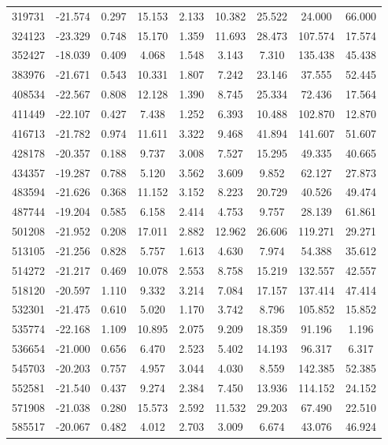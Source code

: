 \documentclass[fleqn,usenatbib]{mnras}
\begin{document}
\begin{table}
\begin{tabular}{S[table-format=6]S[table-format=+2.3]S[table-format=1.3]S[table-format=2.3]S[table-format=1.3]S[table-format=2.3]S[table-format=2.3]S[table-format=3.3]S[table-format=2.3]}
319731 & -21.574 & 0.297 & 15.153 & 2.133 & 10.382 & 25.522 & 24.000 & 66.000\\
324123 & -23.329 & 0.748 & 15.170 & 1.359 & 11.693 & 28.473 & 107.574 & 17.574\\
352427 & -18.039 & 0.409 & 4.068 & 1.548 & 3.143 & 7.310 & 135.438 & 45.438\\
383976 & -21.671 & 0.543 & 10.331 & 1.807 & 7.242 & 23.146 & 37.555 & 52.445\\
408534 & -22.567 & 0.808 & 12.128 & 1.390 & 8.745 & 25.334 & 72.436 & 17.564\\
411449 & -22.107 & 0.427 & 7.438 & 1.252 & 6.393 & 10.488 & 102.870 & 12.870\\
416713 & -21.782 & 0.974 & 11.611 & 3.322 & 9.468 & 41.894 & 141.607 & 51.607\\
428178 & -20.357 & 0.188 & 9.737 & 3.008 & 7.527 & 15.295 & 49.335 & 40.665\\
434357 & -19.287 & 0.788 & 5.120 & 3.562 & 3.609 & 9.852 & 62.127 & 27.873\\
483594 & -21.626 & 0.368 & 11.152 & 3.152 & 8.223 & 20.729 & 40.526 & 49.474\\
487744 & -19.204 & 0.585 & 6.158 & 2.414 & 4.753 & 9.757 & 28.139 & 61.861\\
501208 & -21.952 & 0.208 & 17.011 & 2.882 & 12.962 & 26.606 & 119.271 & 29.271\\
513105 & -21.256 & 0.828 & 5.757 & 1.613 & 4.630 & 7.974 & 54.388 & 35.612\\
514272 & -21.217 & 0.469 & 10.078 & 2.553 & 8.758 & 15.219 & 132.557 & 42.557\\
518120 & -20.597 & 1.110 & 9.332 & 3.214 & 7.084 & 17.157 & 137.414 & 47.414\\
532301 & -21.475 & 0.610 & 5.020 & 1.170 & 3.742 & 8.796 & 105.852 & 15.852\\
535774 & -22.168 & 1.109 & 10.895 & 2.075 & 9.209 & 18.359 & 91.196 & 1.196\\
536654 & -21.000 & 0.656 & 6.470 & 2.523 & 5.402 & 14.193 & 96.317 & 6.317\\
545703 & -20.203 & 0.757 & 4.957 & 3.044 & 4.030 & 8.559 & 142.385 & 52.385\\
552581 & -21.540 & 0.437 & 9.274 & 2.384 & 7.450 & 13.936 & 114.152 & 24.152\\
571908 & -21.038 & 0.280 & 15.573 & 2.592 & 11.532 & 29.203 & 67.490 & 22.510\\
585517 & -20.067 & 0.482 & 4.012 & 2.703 & 3.009 & 6.674 & 43.076 & 46.924\\

\end{tabular}
\end{table}
\end{document}
